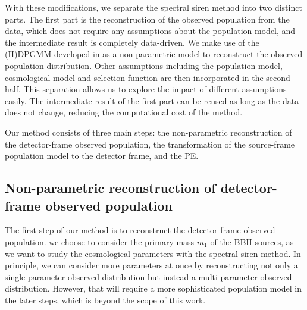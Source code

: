 \documentclass[twocolumn]{aastex631}
\begin{document}
With these modifications, we separate the spectral siren method into two distinct parts.
The first part is the reconstruction of the observed population from the data, which does not require any assumptions about the population model, and the intermediate result is completely data-driven.
We make use of the \ac{(H)DPGMM} developed in \citet{Rinaldi:2021bhm} as a non-parametric model to reconstruct the observed population distribution.
Other assumptions including the population model, cosmological model and selection function are then incorporated in the second half.
This separation allows us to explore the impact of different assumptions easily.
The intermediate result of the first part can be reused as long as the data does not change, reducing the computational cost of the method.

Our method consists of three main steps: the non-parametric reconstruction of the detector-frame observed population, the transformation of the source-frame population model to the detector frame, and the \ac{PE}.

\subsection{Non-parametric reconstruction of detector-frame observed population}
\label{sec:reconstruction}

The first step of our method is to reconstruct the detector-frame observed population.
we choose to consider the primary mass $m_1$ of the \ac{BBH} sources, as we want to study the cosmological parameters with the spectral siren method.
In principle, we can consider more parameters at once by reconstructing not only a single-parameter observed distribution but instead a multi-parameter observed distribution.
However, that will require a more sophisticated population model in the later steps, which is beyond the scope of this work.
\end{document}
